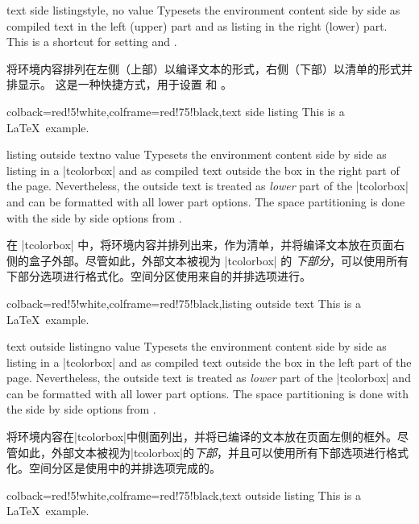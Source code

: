 \begin{docTcbKey}{text side listing}{}{style, no value}
Typesets the environment content side by side as compiled text in the left (upper)
part and as listing in the right (lower) part.
This is a shortcut for setting  and .

将环境内容排列在左侧（上部）以编译文本的形式，右侧（下部）以清单的形式并排显示。 这是一种快捷方式，用于设置  和 。
\begin{dispExample}
\begin{tcblisting}{colback=red!5!white,colframe=red!75!black,text side listing}
This is a \LaTeX\ example.
\end{tcblisting}
\end{dispExample}
\end{docTcbKey}


\begin{docTcbKey}{listing outside text}{}{no value}
Typesets the environment content side by side as listing in a |tcolorbox|
and as compiled text outside the box in the right part of the page.
Nevertheless, the outside text is treated as \emph{lower} part of the
|tcolorbox| and can be formatted with all lower part options.
The space partitioning is done with the side by side options from
.

在 |tcolorbox| 中，将环境内容并排列出来，作为清单，并将编译文本放在页面右侧的盒子外部。尽管如此，外部文本被视为 |tcolorbox| 的 \emph{下部分}，可以使用所有下部分选项进行格式化。空间分区使用来自的并排选项进行。
\begin{dispExample}
\begin{tcblisting}{colback=red!5!white,colframe=red!75!black,listing outside text}
This is a \LaTeX\ example.
\end{tcblisting}
\end{dispExample}
\end{docTcbKey}


\begin{docTcbKey}{text outside listing}{}{no value}
Typesets the environment content side by side as listing in a |tcolorbox|
and as compiled text outside the box in the left part of the page.
Nevertheless, the outside text is treated as \emph{lower} part of the
|tcolorbox| and can be formatted with all lower part options.
The space partitioning is done with the side by side options from
.

将环境内容在|tcolorbox|中侧面列出，并将已编译的文本放在页面左侧的框外。尽管如此，外部文本被视为|tcolorbox|的\emph{下部}，并且可以使用所有下部选项进行格式化。空间分区是使用中的并排选项完成的。
\begin{dispExample}
\begin{tcblisting}{colback=red!5!white,colframe=red!75!black,text outside listing}
This is a \LaTeX\ example.
\end{tcblisting}
\end{dispExample}
\end{docTcbKey}



